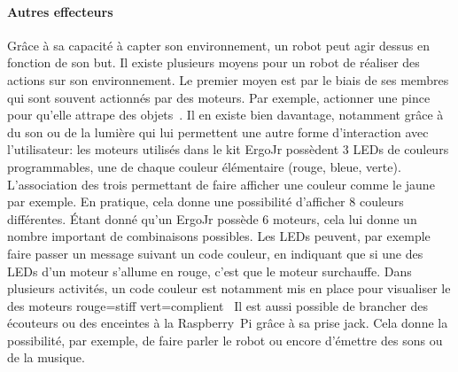             \paragraph{Autres effecteurs}    
                {Grâce à sa capacité à capter son environnement, un robot peut agir dessus en fonction de son but. Il existe plusieurs moyens pour un robot de réaliser des actions sur son environnement. Le premier moyen est par le biais de ses membres qui sont souvent actionnés par des moteurs. Par exemple, actionner une pince pour qu'elle attrape des objets~. Il en existe bien davantage, notamment grâce à du son ou de la lumière qui lui permettent une autre forme d'interaction avec l'utilisateur:
                les moteurs utilisés dans le kit ErgoJr possèdent 3 LEDs de couleurs programmables, une de chaque couleur élémentaire (rouge, bleue, verte). L'association des trois permettant de faire afficher une couleur comme le jaune par exemple. En pratique, cela donne une possibilité d'afficher 8 couleurs différentes. Étant donné qu'un ErgoJr possède 6 moteurs, cela lui donne un nombre important de combinaisons possibles. Les LEDs peuvent, par exemple faire passer un message suivant un code couleur, en indiquant que si une des LEDs d'un moteur s'allume en rouge, c'est que le moteur surchauffe.
                Dans plusieurs activités, un code couleur est notamment mis en place pour visualiser le  des moteurs \eg rouge=stiff vert=complient~
                Il est aussi possible de brancher des écouteurs ou des enceintes à la Raspberry~Pi grâce à sa prise jack. Cela donne la possibilité, par exemple, de faire parler le robot ou encore d'émettre des sons ou de la musique.}%
